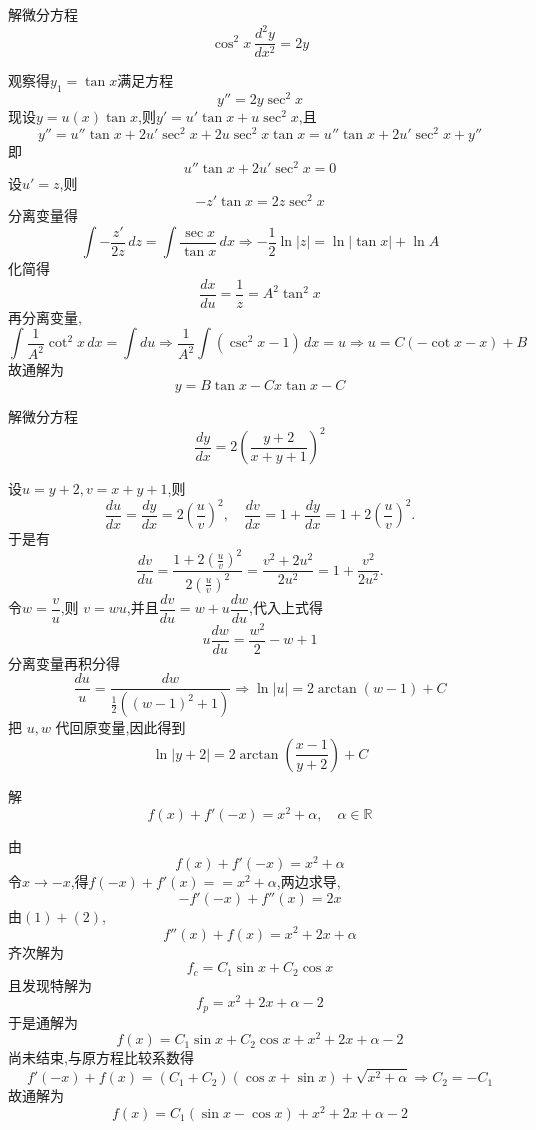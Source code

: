 \begin{questions}
    \question 解微分方程
    \[
    \cos^2x \, \frac{d^2y}{dx^2} = 2y
    \]
    \begin{solution}
        观察得$y_1 = \tan x$满足方程
        \[
        y'' = 2y \sec^2x 
        \]
        现设$y=u(x)\tan x$,则$y'=u'\tan x + u \sec^2 x$,且
        \[
        y''=u''\tan x + 2u'\sec^2 x + 2u\sec^2 x \tan x =u''\tan x + 2u'\sec^2 x + y''
        \]
        即
        \[
        u''\tan x + 2u'\sec^2 x =0
        \]
        设$u' = z$,则
        \[
        - z'\tan x = 2z\sec^2 x
        \]
        分离变量得
        \[
        \int - \frac{z'}{2z} \, dz = \int \frac{\sec x}{\tan x} \, dx \Rightarrow - \frac{1}{2} \ln|z| = \ln|\tan x| + \ln A 
        \]
        化简得
        \[
        \frac{dx}{du}=\frac{1}{z}=A^2\tan^2 x
        \]
        再分离变量,
        \[
        \int \frac{1}{A^2} \cot^2 x \, dx = \int du \Rightarrow \frac{1}{A^2} \int (\csc^2 x - 1) \, dx = u \Rightarrow u= C (-\cot x - x) + B
        \]
        故通解为
        \[
        y = B\tan x - Cx\tan x - C
        \]
    \end{solution}

    \question 解微分方程
    \[
    \frac{dy}{dx}=2\left(\frac{y+2}{x+y+1}\right)^2
    \]
    \begin{solution}
        设$u=y+2, v=x+y+1$,则
        \[
        \frac{du}{dx}=\frac{dy}{dx}=2\left(\frac{u}{v}\right)^2, \quad
        \frac{dv}{dx}=1+\frac{dy}{dx}=1+2\left(\frac{u}{v}\right)^2.
        \]
        于是有
        \[
        \frac{dv}{du}=\frac{1+2\left(\frac{u}{v}\right)^2}{2\left(\frac{u}{v}\right)^2}=\frac{v^2+2u^2}{2u^2}=1+\frac{v^2}{2u^2}.
        \]
        令$w=\dfrac{v}{u}$,则 $v=wu$,并且$\dfrac{dv}{du}=w+u\dfrac{dw}{du}$,代入上式得
        \[
        u\frac{dw}{du}=\frac{w^2}{2}-w+1
        \]
        分离变量再积分得
        \[
        \frac{du}{u}=\frac{dw}{\frac{1}{2}\left((w-1)^2+1\right)} \Rightarrow \ln|u| = 2\arctan(w-1)+C
        \]
        把 $u,w$ 代回原变量,因此得到
        \[
        \ln|y+2| = 2\arctan\left(\frac{x-1}{y+2}\right) + C
        \]
    \end{solution}

    \question 解
    \[
    f(x) + f'(-x) = x^2 + \alpha, \quad \alpha \in \mathbb{R}
    \]
    \begin{solution}
        由
        \[
        f(x) + f'(-x) = x^2 + \alpha \tag{1}
        \]
        令$x \to -x$,得$f(-x)+f'(x)== x^2 + \alpha$,两边求导,
        \[
        -f'(-x) + f''(x) = 2x \tag{2}
        \]
        由$(1)+(2)$,
        \[
        f''(x)+f(x)=x^2 + 2x + \alpha
        \]
        齐次解为
        \[
        f_c=C_1\sin x +C_2\cos x
        \]
        且发现特解为
        \[
        f_p=x^2 + 2x + \alpha-2
        \]
        于是通解为
        \[
        f(x)=C_1\sin x +C_2\cos x+x^2 + 2x + \alpha-2
        \]
        尚未结束,与原方程比较系数得
        \[
        f'(-x) + f(x) = (C_1 + C_2)(\cos x + \sin x) + \sqrt{x^2 + \alpha} \Rightarrow C_2=-C_1
        \]
        故通解为
        \[
        f(x)=C_1(\sin x -\cos x)+x^2 + 2x + \alpha-2
        \]
    \end{solution}


\end{questions}
